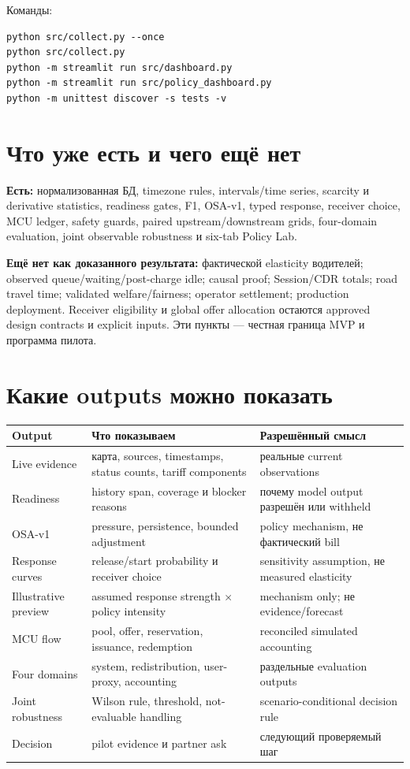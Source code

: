 \documentclass[11pt,a4paper]{article}
\begin{document}
Команды:
\begin{verbatim}
python src/collect.py --once
python src/collect.py
python -m streamlit run src/dashboard.py
python -m streamlit run src/policy_dashboard.py
python -m unittest discover -s tests -v
\end{verbatim}

\section{Что уже есть и чего ещё нет}
\textbf{Есть:} нормализованная БД, timezone rules, intervals/time series, scarcity и derivative statistics, readiness gates, F1, OSA-v1, typed response, receiver choice, MCU ledger, safety guards, paired upstream/downstream grids, four-domain evaluation, joint observable robustness и six-tab Policy Lab.

\textbf{Ещё нет как доказанного результата:} фактической elasticity водителей; observed queue/waiting/post-charge idle; causal proof; Session/CDR totals; road travel time; validated welfare/fairness; operator settlement; production deployment. Receiver eligibility и global offer allocation остаются approved design contracts и explicit inputs. Эти пункты --- честная граница MVP и программа пилота.

\section{Какие outputs можно показать}
\begin{longtable}{p{4.0cm}p{7.2cm}p{4.5cm}}
\toprule Output & Что показываем & Разрешённый смысл \\\midrule\endhead
Live evidence & карта, sources, timestamps, status counts, tariff components & реальные current observations \\
Readiness & history span, coverage и blocker reasons & почему model output разрешён или withheld \\
OSA-v1 & pressure, persistence, bounded adjustment & policy mechanism, не фактический bill \\
Response curves & release/start probability и receiver choice & sensitivity assumption, не measured elasticity \\
Illustrative preview & assumed response strength $\times$ policy intensity & mechanism only; не evidence/forecast \\
MCU flow & pool, offer, reservation, issuance, redemption & reconciled simulated accounting \\
Four domains & system, redistribution, user-proxy, accounting & раздельные evaluation outputs \\
Joint robustness & Wilson rule, threshold, not-evaluable handling & scenario-conditional decision rule \\
Decision & pilot evidence и partner ask & следующий проверяемый шаг \\
\bottomrule
\end{longtable}
\end{document}
